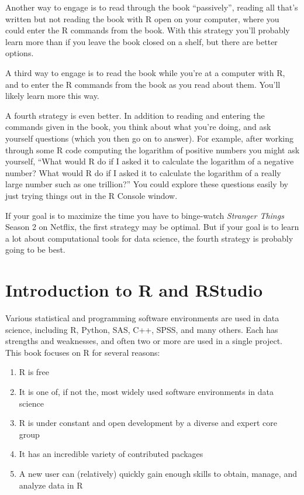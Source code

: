 \documentclass[]{krantz}
\providecommand{\tightlist}{%
  \setlength{\itemsep}{0pt}\setlength{\parskip}{0pt}}
\begin{document}
Another way to engage is to read through the book ``passively'', reading all that's written but not reading the book with R open on your computer, where you could enter the R commands from the book. With this strategy you'll probably learn more than if you leave the book closed on a shelf, but there are better options.

A third way to engage is to read the book while you're at a computer with R, and to enter the R commands from the book as you read about them. You'll likely learn more this way.

A fourth strategy is even better. In addition to reading and entering the commands given in the book, you think about what you're doing, and ask yourself questions (which you then go on to answer). For example, after working through some R code computing the logarithm of positive numbers you might ask yourself, ``What would R do if I asked it to calculate the logarithm of a negative number? What would R do if I asked it to calculate the logarithm of a really large number such as one trillion?'' You could explore these questions easily by just trying things out in the R Console window.

If your goal is to maximize the time you have to binge-watch \emph{Stranger Things} Season 2 on Netflix, the first strategy may be optimal. But if your goal is to learn a lot about computational tools for data science, the fourth strategy is probably going to be best.

\hypertarget{introduction-to-r-and-rstudio}{%
\chapter{Introduction to R and RStudio}\label{introduction-to-r-and-rstudio}}

Various statistical and programming software environments are used in data science, including R, Python, SAS, C++, SPSS, and many others. Each has strengths and weaknesses, and often two or more are used in a single project. This book focuses on R for several reasons:

\begin{enumerate}
\def\labelenumi{\arabic{enumi}.}
\tightlist
\item
  R is free
\item
  It is one of, if not the, most widely used software environments in data science
\item
  R is under constant and open development by a diverse and expert core group
\item
  It has an incredible variety of contributed packages
\item
  A new user can (relatively) quickly gain enough skills to obtain, manage, and analyze data in R
\end{enumerate}
\end{document}
